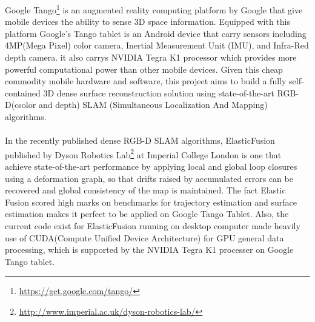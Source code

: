 \documentclass[12pt,twoside]{article}
\begin{document}
                                                                                                                                                                                                                                                                                                                                                                                                                                                                                                                                                                                                                                                                                                                                                                                                                                                                                                                                                                                                                                                                                                                                                                                                                                                                                      
Google Tango\footnote{\url{https://get.google.com/tango/}} is an augmented reality computing platform by Google that give mobile devices the ability to sense 3D space information. Equipped with this platform Google's Tango tablet is an Android device that carry sensors including 4MP(Mega Pixel) color camera, Inertial Measurement Unit (IMU), and Infra-Red depth camera. it also carrys NVIDIA Tegra K1 processor which provides more powerful computational power than other mobile devices. Given this cheap commodity mobile hardware and software, this project aims to build a fully self-contained 3D dense surface reconstruction solution using  state-of-the-art RGB-D(csolor and depth) SLAM (Simultaneous Localization And Mapping) algorithms.\\
\\
In the recently published dense RGB-D SLAM algorithms, ElasticFusion\cite{whelan2016elasticfusion} published by Dyson Robotics Lab\footnote{\url{http://www.imperial.ac.uk/dyson-robotics-lab/}} at Imperial College London is one that achieve state-of-the-art performance by applying local and global loop closures using a deformation graph, so that drifts raised by accumulated errors can be recovered and global consistency of the map is maintained. The fact Elastic Fusion scored high marks on benchmarks for trajectory estimation and surface estimation makes it perfect to be applied on Google Tango Tablet. Also, the current code exist for ElasticFusion running on desktop computer made heavily use of CUDA(Compute Unified Device Architecture) for GPU general data processing, which is supported by the NVIDIA Tegra K1 processer on Google Tango tablet.\\
\end{document}
